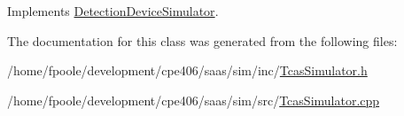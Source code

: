 Implements \hyperlink{class_detection_device_simulator_ae9e5d29238a9bcc104b4004b52ddffd9}{Detection\+Device\+Simulator}.



The documentation for this class was generated from the following files\+:\begin{DoxyCompactItemize}
\item 
/home/fpoole/development/cpe406/saas/sim/inc/\hyperlink{_tcas_simulator_8h}{Tcas\+Simulator.\+h}\item 
/home/fpoole/development/cpe406/saas/sim/src/\hyperlink{_tcas_simulator_8cpp}{Tcas\+Simulator.\+cpp}\end{DoxyCompactItemize}
